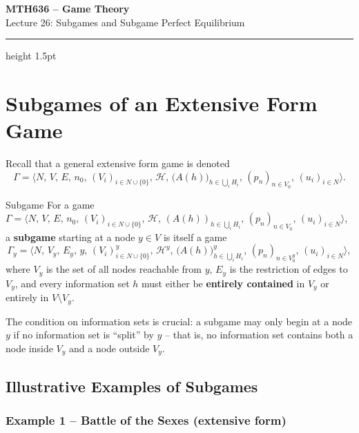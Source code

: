 \documentclass[12pt, a4paper]{article}
\begin{document}
\begin{center}
  {\LARGE\bfseries\sffamily\color{defblue} MTH636 -- Game Theory}\\[6pt]
  {\Large\sffamily Lecture 26: Subgames and Subgame Perfect Equilibrium}\\[4pt]
\end{center}
\vspace{0.5cm}
\hrule height 1.5pt
\vspace{0.3cm}

\section{Subgames of an Extensive Form Game}

Recall that a general extensive form game is denoted
\[
  \Gamma = \langle N,\, V,\, E,\, n_0,\, (V_i)_{i \in N \cup \{0\}},\,
           \mathcal{H},\, \bigl(A(h)\bigr)_{h \in \bigcup_{i} H_i},\,
           (p_n)_{n \in V_0},\, (u_i)_{i \in N} \rangle.
\]

\begin{defbox}{Subgame}
  For a game
  $\Gamma = \langle N,\, V,\, E,\, n_0,\, (V_i)_{i \in N \cup \{0\}},\,
  \mathcal{H},\, (A(h))_{h \in \bigcup_{i} H_i},\, (p_n)_{n \in V_0},\,
  (u_i)_{i \in N} \rangle$,
  a \textbf{subgame} starting at a node $y \in V$ is itself a game
  \[
    \Gamma_y = \langle N,\, V_y,\, E_y,\, y,\, (V_i)^y_{i \in N \cup \{0\}},\,
               \mathcal{H}^y,\, \bigl(A(h)\bigr)^y_{h \in \bigcup_{i} H_i},\,
               (p_n)_{n \in V_{0}^{y}},\, (u_i)_{i \in N} \rangle,
  \]
  where $V_y$ is the set of all nodes reachable from $y$, $E_y$ is the
  restriction of edges to $V_y$, and every information set $h$ must
  either be \textbf{entirely contained} in $V_y$ or entirely in
  $V \setminus V_y$.
\end{defbox}

The condition on information sets is crucial: a subgame may only begin at
a node $y$ if no information set is ``split'' by $y$ -- that is, no
information set contains both a node inside $V_y$ and a node outside $V_y$.

\subsection{Illustrative Examples of Subgames}

\subsubsection*{Example 1 -- Battle of the Sexes (extensive form)}
\end{document}
